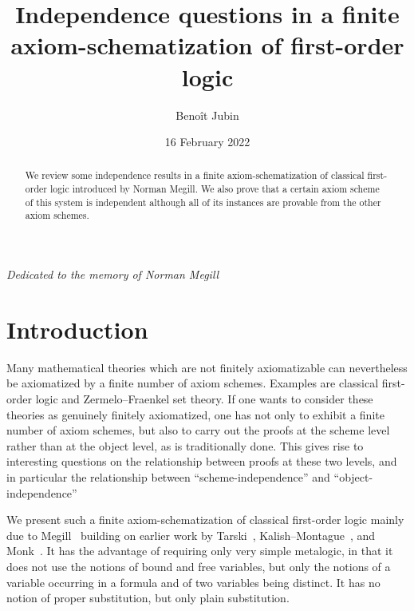 \documentclass[11pt]{article}
\title{Independence questions in a finite\\axiom-schematization of first-order logic}
\author{Beno\^it Jubin}
\date{16 February 2022}
\theoremstyle{plain}
\theoremstyle{definition}
\theoremstyle{remark}
\begin{document}
\maketitle


\begin{center}
\textit{Dedicated to the memory of Norman Megill}
\end{center}



\begin{abstract}
We review some independence results in a finite axiom-schematization of classical first-order
logic introduced by Norman Megill.  We also prove that a certain axiom scheme of this system is
independent although all of its instances are provable from the other axiom schemes.
\end{abstract}



\setcounter{tocdepth}{2}
\tableofcontents




\section*{Introduction}

Many mathematical theories which are not finitely axiomatizable can nevertheless be axiomatized
by a finite number of axiom schemes.
Examples are classical first-order logic and Zermelo--Fraenkel set theory.
If one wants to consider these theories as genuinely finitely axiomatized, one has not only to
exhibit a finite number of axiom schemes, but also to carry out the proofs at the scheme level
rather than at the object level, as is traditionally done.
This gives rise to interesting questions on the relationship between proofs at these two levels,
and in particular the relationship between ``scheme-independence'' and
``object-independence''

We present such a finite axiom-schematization of classical first-order logic mainly due to
Megill~\cite{megill} building on earlier work by Tarski~\cite{tarski}, Kalish--Montague~\cite{km},
and Monk~\cite{monk}.
It has the advantage of requiring only very simple metalogic, in that it does not use the notions
of bound and free variables, but only the notions of a variable occurring in a formula and of two
variables being distinct.
It has no notion of proper substitution, but only plain substitution.
\end{document}
